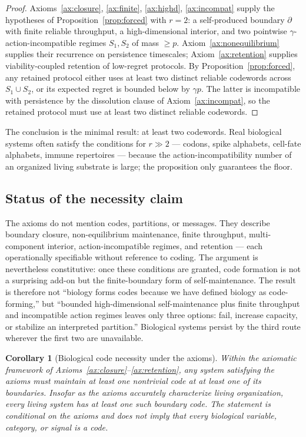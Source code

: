 \documentclass[12pt]{article}
\newtheorem{corollary}{Corollary}
\theoremstyle{definition}
\begin{document}
\begin{proof}
Axioms~\ref{ax:closure}, \ref{ax:finite}, \ref{ax:highd}, \ref{ax:incompat} supply the hypotheses of Proposition~\ref{prop:forced} with $r=2$: a self-produced boundary $\partial$ with finite reliable throughput, a high-dimensional interior, and two pointwise $\gamma$-action-incompatible regimes $S_1, S_2$ of mass $\geq p$. Axiom~\ref{ax:nonequilibrium} supplies their recurrence on persistence timescales; Axiom~\ref{ax:retention} supplies viability-coupled retention of low-regret protocols. By Proposition~\ref{prop:forced}, any retained protocol either uses at least two distinct reliable codewords across $S_1 \cup S_2$, or its expected regret is bounded below by $\gamma p$. The latter is incompatible with persistence by the dissolution clause of Axiom~\ref{ax:incompat}, so the retained protocol must use at least two distinct reliable codewords.
\end{proof}

The conclusion is the minimal result: at least two codewords. Real biological systems often satisfy the conditions for $r \gg 2$ --- codons, spike alphabets, cell-fate alphabets, immune repertoires --- because the action-incompatibility number of an organized living substrate is large; the proposition only guarantees the floor.

\subsection{Status of the necessity claim}

The axioms do not mention codes, partitions, or messages. They describe boundary closure, non-equilibrium maintenance, finite throughput, multi-component interior, action-incompatible regimes, and retention --- each operationally specifiable without reference to coding. The argument is nevertheless constitutive: once these conditions are granted, code formation is not a surprising add-on but the finite-boundary form of self-maintenance. The result is therefore not ``biology forms codes because we have defined biology as code-forming,'' but ``bounded high-dimensional self-maintenance plus finite throughput and incompatible action regimes leaves only three options: fail, increase capacity, or stabilize an interpreted partition.'' Biological systems persist by the third route wherever the first two are unavailable.

\begin{corollary}[Biological code necessity under the axioms]
\label{cor:calibrated}
Within the axiomatic framework of Axioms~\ref{ax:closure}--\ref{ax:retention}, any system satisfying the axioms must maintain at least one nontrivial code at at least one of its boundaries. Insofar as the axioms accurately characterize living organization, every living system has at least one such boundary code. The statement is conditional on the axioms and does not imply that every biological variable, category, or signal is a code.
\end{corollary}
\end{document}
